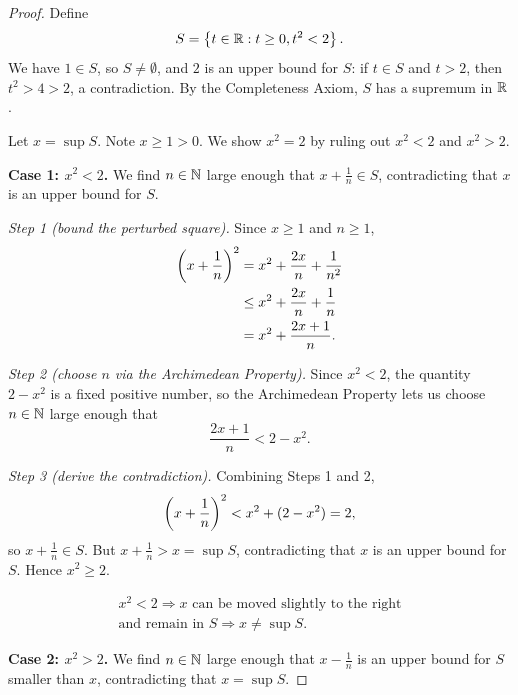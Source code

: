 \begin{proof}
    Define
    \begin{equation*}
        S = \left\{t \in \mathbb{R} : t \geq 0, t^2 < 2\right\}.
    \end{equation*}
    We have $1 \in S$, so $S \neq \emptyset$, and $2$ is an upper bound for $S$: if $t\in S$ and $t>2$, then $t^2>4>2$, a contradiction. By the Completeness Axiom, $S$ has a supremum in $\mathbb{R}$.

    Let $x = \sup S$. Note $x \geq 1 > 0$. We show $x^2 = 2$ by ruling out $x^2 < 2$ and $x^2 > 2$.

    \textbf{Case 1: $x^2 < 2$.} We find $n \in \mathbb{N}$ large enough that $x + \frac{1}{n} \in S$, contradicting that $x$ is an upper bound for $S$.

    \textit{Step 1 (bound the perturbed square).} Since $x \geq 1$ and $n\geq1$,
    \begin{align*}
        \left(x + \frac{1}{n}\right)^2 &= x^2 + \frac{2x}{n} + \frac{1}{n^2} \\
        &\leq x^2 + \frac{2x}{n} + \frac{1}{n} \\
        &= x^2 + \frac{2x+1}{n}.
    \end{align*}

    \textit{Step 2 (choose $n$ via the Archimedean Property).} Since $x^2 < 2$, the quantity $2-x^2$ is a fixed positive number, so the Archimedean Property lets us choose $n\in\mathbb{N}$ large enough that
    \begin{equation*}
        \frac{2x+1}{n} < 2 - x^2.
    \end{equation*}

    \textit{Step 3 (derive the contradiction).} Combining Steps 1 and 2,
    \begin{equation*}
        \left(x + \frac{1}{n}\right)^2 < x^2 + (2 - x^2) = 2,
    \end{equation*}
    so $x + \frac{1}{n} \in S$. But $x + \frac{1}{n} > x = \sup S$, contradicting that $x$ is an upper bound for $S$. Hence $x^2 \geq 2$.

    \[
        \boxed{
        \begin{array}{c}
            x^2<2 \Longrightarrow x\text{ can be moved slightly to the right} \\
            \text{and remain in }S \Longrightarrow x\neq\sup S.
        \end{array}
        }
    \]

    \textbf{Case 2: $x^2 > 2$.} We find $n \in \mathbb{N}$ large enough that $x - \frac{1}{n}$ is an upper bound for $S$ smaller than $x$, contradicting that $x = \sup S$.


\end{proof}

